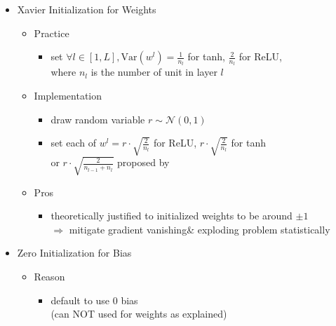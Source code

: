 \begin{itemize}
\item Xavier Initialization for Weights \label{DL_Init_Xavier}
	\begin{itemize}
	\item Practice
		\begin{itemize}
		\item set $\forall l\in [1,L], \text{Var}(w^l) = \frac 1{n_l}$ for tanh, $\frac 2{n_l}$ for ReLU, \\
		where $n_l$ is the number of unit in layer $l$
		\end{itemize}
	\item Implementation
		\begin{itemize}
		\item draw random variable $r\sim \mathcal N(0,1)$
		\item set each of $w^l=r\cdot \sqrt{\frac 2 {n_l}}$ for ReLU, $r\cdot \sqrt{\frac 2 {n_l}}$ for tanh \\ 
		or $r\cdot \sqrt{\frac 2 {n_{l-1}+n_l}}$ proposed by 
		\end{itemize}
	\item Pros
		\begin{itemize}
		\item theoretically justified to initialized weights to be around $\pm 1$ \\
		$\Rightarrow$ mitigate gradient vanishing\& exploding problem statistically 
		\end{itemize}
	\end{itemize}
\item Zero Initialization for Bias
	\begin{itemize}
	\item Reason
		\begin{itemize}
		\item default to use $0$ bias \\
		(can NOT used for weights as explained)
		\end{itemize}
	\end{itemize}
\end{itemize}

